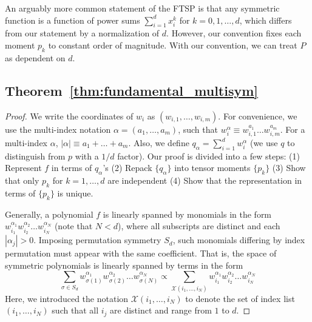 \documentclass{article}
\theoremstyle{plain}
\begin{document}
An arguably more common statement of the FTSP is that any symmetric function is a function of power sums $\sum_{i=1}^{d} x_i^k$ for $k=0,1,\dots, d$, which differs from our statement by a normalization of $d$. However, our convention fixes each moment $p_k$ to constant order of magnitude. With our convention, we can treat $P$ as dependent on $d$. 


\subsection{Theorem~\ref{thm:fundamental_multisym}}
\begin{proof}
    We write the coordinates of $w_i$ as $(w_{i,1}, \dots, w_{i,m})$. For convenience, we use the multi-index notation $\alpha = (a_1, \dots, a_m)$, such that $w_i^\alpha \equiv w_{i,1}^{a_1} \dots w_{i,m}^{a_m}$. For a multi-index $\alpha$, $|\alpha| \equiv a_1 + \dots + a_m$. Also, we define $q_\alpha = \sum_{i=1}^d w_i^\alpha$ (we use $q$ to distinguish from $p$ with a $1/d$ factor). Our proof is divided into a few steps: (1) Represent $f$ in terms of $q_\alpha$'s (2) Repack $\{q_\alpha\}$ into tensor moments $\{p_k\}$ (3) Show that only $p_k$ for $k=1,\dots, d$ are independent (4) Show that the representation in terms of $\{p_k\}$ is unique. 

    Generally, a polynomial $f$ is linearly spanned by monomials in the form $w_{i_1}^{\alpha_1} w_{i_2}^{\alpha_2} \dots w_{i_N}^{\alpha_N}$ (note that $N<d$), where all subscripts are distinct and each $|\alpha_j| >0$. Imposing permutation symmetry $S_d$, such monomials differing by index permutation must appear with the same coefficient. That is, the space of symmetric polynomials is linearly spanned by terms in the form
    \begin{equation}    \label{eq:general_sym_term}
        \sum_{\sigma\in S_d} w_{\sigma(1)}^{\alpha_1} w_{\sigma(2)}^{\alpha_2} \dots w_{\sigma(N)}^{\alpha_N}
        \propto \sum_{\mathcal{X}(i_1, \dots, i_N)} w_{i_1}^{\alpha_1} w_{i_2}^{\alpha_2} \dots w_{i_N}^{\alpha_N}
    \end{equation}
    Here, we introduced the notation $\mathcal{X}(i_1, \dots, i_N)$ to denote the set of index list $(i_1, \dots, i_N)$ such that all $i_j$ are distinct and range from $1$ to $d$. 


\end{proof}
\end{document}

